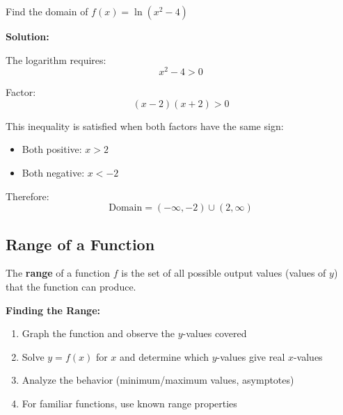 \documentclass[12pt,a4paper]{article}
\begin{document}
\begin{example}
Find the domain of $f(x) = \ln(x^2 - 4)$

\textbf{Solution:}

The logarithm requires:
\[
x^2 - 4 > 0
\]

Factor:
\[
(x-2)(x+2) > 0
\]

This inequality is satisfied when both factors have the same sign:
\begin{itemize}
    \item Both positive: $x > 2$
    \item Both negative: $x < -2$
\end{itemize}

Therefore:
\[
\text{Domain} = (-\infty, -2) \cup (2, \infty)
\]
\end{example}

\subsection{Range of a Function}

\begin{definition}
The \textbf{range} of a function $f$ is the set of all possible output values (values of $y$) that the function can produce.
\end{definition}

\begin{strategy}
\textbf{Finding the Range:}

\begin{enumerate}
    \item Graph the function and observe the $y$-values covered
    \item Solve $y = f(x)$ for $x$ and determine which $y$-values give real $x$-values
    \item Analyze the behavior (minimum/maximum values, asymptotes)
    \item For familiar functions, use known range properties
\end{enumerate}
\end{strategy}
\end{document}
